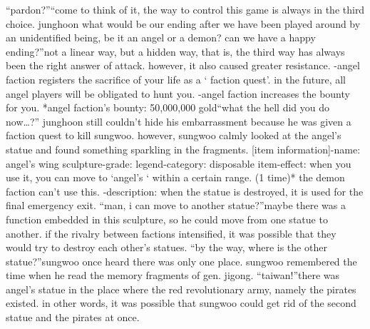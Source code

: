 “pardon?”“come to think of it, the way to control this game is always in the third choice.
 junghoon what would be our ending after we have been played around by an unidentified being, be it an angel or a demon? can we have a happy ending?”not a linear way, but a hidden way, that is, the third way has always been the right answer of attack.
 however, it also caused greater resistance.
-angel faction registers the sacrifice of your life as a ‘ faction quest’.
 in the future, all angel players will be obligated to hunt you.
-angel faction increases the bounty for you.
*angel faction’s bounty: 50,000,000 gold“what the hell did you do now…?” junghoon still couldn’t hide his embarrassment because he was given a faction quest to kill sungwoo.
however, sungwoo calmly looked at the angel’s statue and found something sparkling in the fragments.
[item information]-name: angel’s wing sculpture-grade: legend-category: disposable item-effect: when you use it, you can move to ‘angel’s ‘ within a certain range.
 (1 time)* the demon faction can’t use this.
-description: when the statue is destroyed, it is used for the final emergency exit.
“man, i can move to another statue?”maybe there was a function embedded in this sculpture, so he could move from one statue to another.
 if the rivalry between factions intensified, it was possible that they would try to destroy each other’s statues.
“by the way, where is the other statue?”sungwoo once heard there was only one place.
 sungwoo remembered the time when he read the memory fragments of gen.
 jigong.
“taiwan!”there was angel’s statue in the place where the red revolutionary army, namely the pirates existed.
in other words, it was possible that sungwoo could get rid of the second statue and the pirates at once.


 